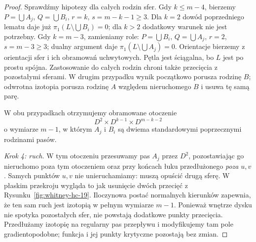 \begin{proof}
Sprawdźmy hipotezy dla całych rodzin sfer. Gdy $k\leq m-4$,
bierzemy $P=\bigcup A_j$, $Q=\bigcup B_i$,
$r=k$, $s=m-k-1\geq3$. Dla $k=2$ dowód poprzedniego lematu
daje już $\pi_1(L\setminus\bigcup B_i)=0$; dla $k>2$
dodatkowy warunek nie jest potrzebny. Gdy $k=m-3$,
zamieniamy role: $P=\bigcup B_i$, $Q=\bigcup A_j$,
$r=2$, $s=m-3\geq3$; dualny argument daje
$\pi_1(L\setminus\bigcup A_j)=0$.
Orientacje bierzemy z orientacji sfer i ich obramowań uchwytowych.
Pętla jest ściągalna, bo $L$ jest po prostu spójna.
Zastosowanie do całych rodzin chroni także przecięcia z pozostałymi
sferami. W drugim przypadku wynik początkowo porusza rodzinę $B$;
odwrotna izotopia porusza rodzinę $A$ względem nieruchomego $B$
i usuwa tę samą parę.

W obu przypadkach otrzymujemy obramowane
otoczenie
\[
 D^2\times D^{k-1}
       \times D^{m-k-2}
\]
o wymiarze $m-1$,
w którym $A_j$ i $B_i$
są dwiema standardowymi
poprzecznymi rodzinami pasów.

\emph{Krok 4: ruch.}
W tym otoczeniu przesuwamy
pas $A_j$ przez $D^2$,
pozostawiając go nieruchomo poza tym otoczeniem oraz przy końcach łuku
przedłużonego \emph{poza} $u,v$. Samych punktów $u,v$ nie
unieruchamiamy: muszą opuścić drugą sferę. W płaskim
przekroju wygląda to jak
usunięcie dwóch przecięć
z Rysunku~\ref{fig:whitney-hc-19}.
Iloczynowa postać normalnych
kierunków zapewnia,
że ten sam ruch jest izotopią
w pełnym wymiarze $m-1$.
Ponieważ wnętrze dysku
nie spotyka pozostałych sfer,
nie powstają dodatkowe
punkty przecięcia.
Przedłużamy izotopię
na regularny pas przepływu
i modyfikujemy tam pole
gradientopodobne; funkcja
i jej punkty krytyczne
pozostają bez zmian.
\end{proof}

